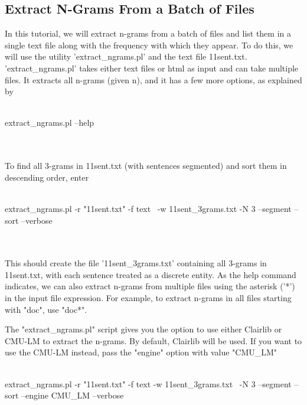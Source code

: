 \subsection{Extract N-Grams From a Batch of Files}
In this tutorial, we will extract n-grams from a batch of files and list them in a single text file along with the frequency with which they appear. To do this, we will use the utility 'extract\_ngrams.pl' and the text file 11sent.txt. 'extract\_ngrams.pl' takes either text files or html as input and can take multiple files. It extracts all n-grams (given n), and it has a few more options, as explained by
\\
\\
\begin{boxedverbatim}
extract_ngrams.pl --help
\end{boxedverbatim}
\\
\\
To find all 3-grams in 11sent.txt (with sentences segmented) and sort them in descending order, enter
\\
\\
\begin{boxedverbatim}
 extract_ngrams.pl -r "11sent.txt" -f text \
 -w 11sent_3grams.txt -N 3 --segment --sort --verbose
\end{boxedverbatim}
\\
\\
This should create the file '11sent\_3grams.txt' containing all 3-grams in 11sent.txt, with each sentence treated as a discrete entity. As the help command indicates, we can also extract n-grams from multiple files using the asterisk ('*') in the input file expression. For example, to extract n-grams in all files starting with "doc", use "doc*".

The "extract\_ngrams.pl" script gives you the option to use either Clairlib or CMU-LM to extract the n-grams. By default, Clairlib will be used. If you want to use the CMU-LM instead, pass the "engine" option with value "CMU\_LM"
\\
\\
\begin{boxedverbatim}
extract_ngrams.pl -r "11sent.txt" -f text -w 11sent_3grams.txt \
-N 3 --segment --sort --engine CMU_LM --verbose
\end{boxedverbatim}